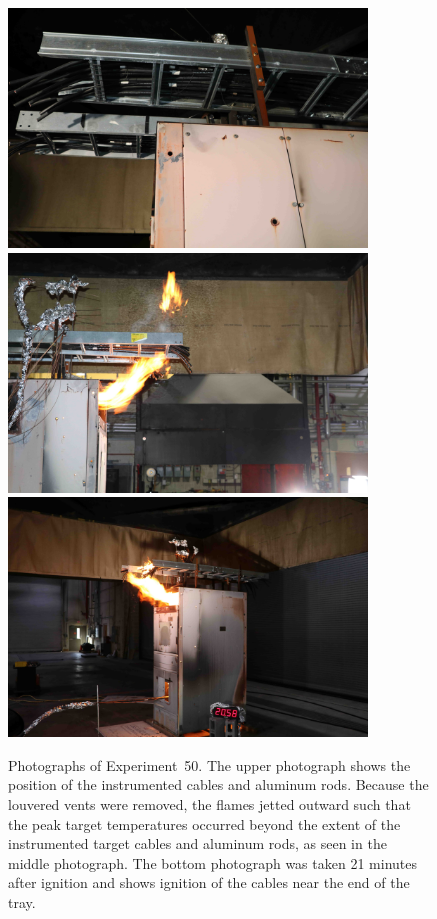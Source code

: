 \begin{figure}[p]
\centering
\includegraphics[height=2.50in]{../FIGURES/Test_50_cables} \\
\includegraphics[height=2.50in]{../FIGURES/Test_50_side} \\
\includegraphics[height=2.50in]{../FIGURES/Test_50_20_min_58_s}
\caption[Photographs of Experiment~50]{Photographs of Experiment~50. The upper photograph shows the position of the instrumented cables and aluminum rods. Because the louvered vents were removed, the flames jetted outward such that the peak target temperatures occurred beyond the extent of the instrumented target cables and aluminum rods, as seen in the middle photograph. The bottom photograph was taken 21 minutes after ignition and shows ignition of the cables near the end of the tray.}
\label{fig:Test_50_photos}
\end{figure}


